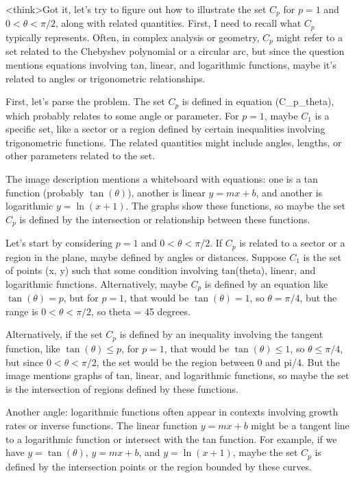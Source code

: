 <think>Got it, let's try to figure out how to illustrate the set \( C_p \) for \( p = 1 \) and \( 0 < \theta < \pi/2 \), along with related quantities. First, I need to recall what \( C_p \) typically represents. Often, in complex analysis or geometry, \( C_p \) might refer to a set related to the Chebyshev polynomial or a circular arc, but since the question mentions equations involving tan, linear, and logarithmic functions, maybe it's related to angles or trigonometric relationships.

First, let's parse the problem. The set \( C_p \) is defined in equation (C_p_theta), which probably relates to some angle or parameter. For \( p = 1 \), maybe \( C_1 \) is a specific set, like a sector or a region defined by certain inequalities involving trigonometric functions. The related quantities might include angles, lengths, or other parameters related to the set.

The image description mentions a whiteboard with equations: one is a tan function (probably \( \tan(\theta) \)), another is linear \( y = mx + b \), and another is logarithmic \( y = \ln(x + 1) \). The graphs show these functions, so maybe the set \( C_p \) is defined by the intersection or relationship between these functions.

Let's start by considering \( p = 1 \) and \( 0 < \theta < \pi/2 \). If \( C_p \) is related to a sector or a region in the plane, maybe defined by angles or distances. Suppose \( C_1 \) is the set of points (x, y) such that some condition involving tan(theta), linear, and logarithmic functions. Alternatively, maybe \( C_p \) is defined by an equation like \( \tan(\theta) = p \), but for \( p = 1 \), that would be \( \tan(\theta) = 1 \), so \( \theta = \pi/4 \), but the range is \( 0 < \theta < \pi/2 \), so theta = 45 degrees.

Alternatively, if the set \( C_p \) is defined by an inequality involving the tangent function, like \( \tan(\theta) \leq p \), for \( p = 1 \), that would be \( \tan(\theta) \leq 1 \), so \( \theta \leq \pi/4 \), but since \( 0 < \theta < \pi/2 \), the set would be the region between 0 and pi/4. But the image mentions graphs of tan, linear, and logarithmic functions, so maybe the set is the intersection of regions defined by these functions.

Another angle: logarithmic functions often appear in contexts involving growth rates or inverse functions. The linear function \( y = mx + b \) might be a tangent line to a logarithmic function or intersect with the tan function. For example, if we have \( y = \tan(\theta) \), \( y = mx + b \), and \( y = \ln(x + 1) \), maybe the set \( C_p \) is defined by the intersection points or the region bounded by these curves.

